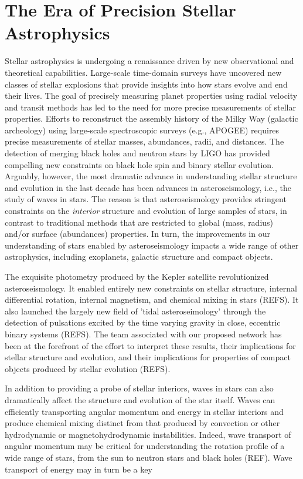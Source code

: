 \section{The Era of Precision Stellar Astrophysics}

Stellar astrophysics is undergoing a renaissance driven by new observational and theoretical capabilities. Large-scale time-domain surveys have uncovered new classes of stellar explosions that provide insights into how stars evolve and end their lives.  The goal of precisely measuring planet properties using radial velocity and transit methods has led to the need for more precise measurements of stellar properties.  Efforts to reconstruct the assembly history of the Milky Way (galactic archeology) using large-scale spectroscopic surveys (e.g., APOGEE) requires precise measurements of stellar masses, abundances, radii, and distances.   The detection of merging black holes and neutron stars by LIGO has provided compelling new constraints on black hole spin and binary stellar evolution. Arguably, however, the most dramatic advance in understanding stellar structure and evolution in the last decade has been advances in asteroseismology, i.e., the study of waves in stars.   The reason is that asteroseismology provides stringent constraints on the {\em interior} structure and evolution of large samples of stars, in contrast to traditional methods that are restricted to global (mass, radius) and/or surface (abundances) properties.   In turn, the improvements in our understanding of stars enabled by asteroseismology impacts a wide range of other astrophysics, including exoplanets, galactic structure and compact objects.  

The exquisite photometry produced by the Kepler satellite revolutionized asteroseismology.  It enabled entirely new constraints on stellar structure, internal differential rotation, internal magnetism, and chemical mixing in stars (REFS).  It also launched the largely new field of 'tidal asteroseimology' through the detection of pulsations excited by the time varying gravity in close, eccentric binary systems (REFS). The team associated with our proposed network has been at the forefront of the effort to interpret these results, their implications for stellar structure and evolution, and their implications for properties of compact objects produced by stellar evolution (REFS).   

In addition to providing a probe of stellar interiors, waves in stars can also dramatically affect the structure and evolution of the star itself.   Waves can efficiently transporting angular momentum and energy in stellar interiors and produce chemical mixing distinct from that produced by convection or other hydrodynamic or magnetohydrodynamic instabilities.   Indeed, wave transport of angular momentum may be critical for understanding the rotation profile of a wide range of stars, from the sun to neutron stars and black holes (REF).   Wave transport of energy may in turn be a key 
